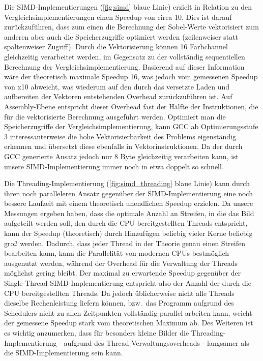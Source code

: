 \documentclass[course=erap]{aspdoc}
\begin{document}
Die SIMD-Implementierungen (\ref{fig:simd} blaue Linie) erzielt in Relation zu den Vergleichsimplementierungen einen Speedup von circa 10.
Dies ist darauf zurückzuführen, dass zum einen die Berechnung der Sobel-Werte vektorisiert zum anderen aber auch die Speicherzugriffe optimiert werden (zeilenweiser statt spaltenweiser Zugriff).
Durch die Vektorisierung können 16 Farbchannel gleichzeitig verarbeitet werden, im Gegensatz zu der vollständig sequentiellen Berechnung der Vergleichsimplementierung.
Basierend auf dieser Information wäre der theoretisch maximale Speedup 16, was jedoch vom gemessenen Speedup von x10 abweicht, was wiederum auf den durch das versetzte Laden und aufbereiten der Vektoren entstehenden Overhead zurückzuführen ist.
Auf Assembly-Ebene entspricht dieser Overhead fast der Hälfte der Instruktionen, die für die vektorisierte Berechnung ausgeführt werden.
Optimiert man die Speicherzugriffe der Vergleichsimplementierung, kann GCC ab Optimierungsstufe 3 interessanterweise die hohe Vektorisierbarkeit des Problems eigenständig erkennen und übersetzt diese ebenfalls in Vektorinstruktionen.
Da der durch GCC generierte Ansatz jedoch nur 8 Byte gleichzeitig verarbeiten kann, ist unsere SIMD-Implementierung immer noch in etwa doppelt so schnell.

Die Threading-Implementierung (\ref{fig:simd_threading} blaue Linie) kann durch ihren noch paralleleren Ansatz gegenüber der SIMD-Implementierung eine noch bessere Laufzeit mit einem theoretisch unendlichen Speedup erzielen.
Da unsere Messungen ergeben haben, dass die optimale Anzahl an Streifen, in die das Bild aufgeteilt werden soll, den durch die CPU bereitgestellten Threads entspricht, kann der Speedup (theoretisch) durch Hinzufügen beliebig vieler Kerne beliebig groß werden.
Dadurch, dass jeder Thread in der Theorie genau einen Streifen bearbeiten kann, kann die Parallelität von modernen CPUs bestmöglich ausgenutzt werden, während der Overhead für die Verwaltung der Threads möglichst gering bleibt.
Der maximal zu erwartende Speedup gegenüber der Single-Thread-SIMD-Implementierung entspricht also der Anzahl der durch die CPU bereitgestellten Threads.
Da jedoch üblicherweise nicht alle Threads dieselbe Rechenleistung liefern können, bzw.\ das Programm aufgrund des Schedulers nicht zu allen Zeitpunkten vollständig parallel arbeiten kann, weicht der gemessene Speedup stark vom theoretischen Maximum ab.
Des Weiteren ist es wichtig anzumerken, dass für besonders kleine Bilder die Threading-Implementierung - aufgrund des Thread-Verwaltungsoverheads - langsamer als die SIMD-Implementierung sein kann.
\end{document}
